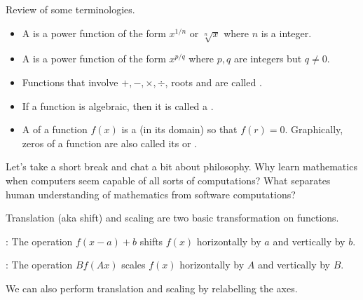 \documentclass[../main.tex]{subfiles}
\begin{document}
Review of some terminologies. 
\begin{itemize}[wide, noitemsep]
  \item A  is a power function of the form \(x^{1/n}\) or \(\sqrt[n]{x}\) where \(n\) is a  integer. 


  \item A  is a power function of the form \(x^{p/q}\) where \(p,q\) are integers but \(q \ne 0\).


  \item Functions that involve \(+, -, \times, \div\), roots and  are called . 


  \item If a function is  algebraic, then it is called a .


  \item A  of a function \(f(x)\) is a  (in its domain) so that \(f(r) = 0\).  Graphically, zeros of a function are also called its  or \hlmain{\underline{\hspace{1in}}}.

\end{itemize}

Let's take a short break and chat a bit about philosophy. \faComments{} Why learn mathematics when computers seem capable of all sorts of computations? \faComments{} What separates human understanding of mathematics from software computations?

\clearpage

Translation (aka shift) and scaling are two basic transformation on functions.

: The operation \(f(x - a) + b\) shifts \(f(x)\) horizontally by \(a\) and vertically by \(b\). 


: The operation \(B f(A x)\) scales \(f(x)\) horizontally by \(A\) and vertically by \(B\).


We can also perform translation and scaling by relabelling the axes. 
\end{document}
